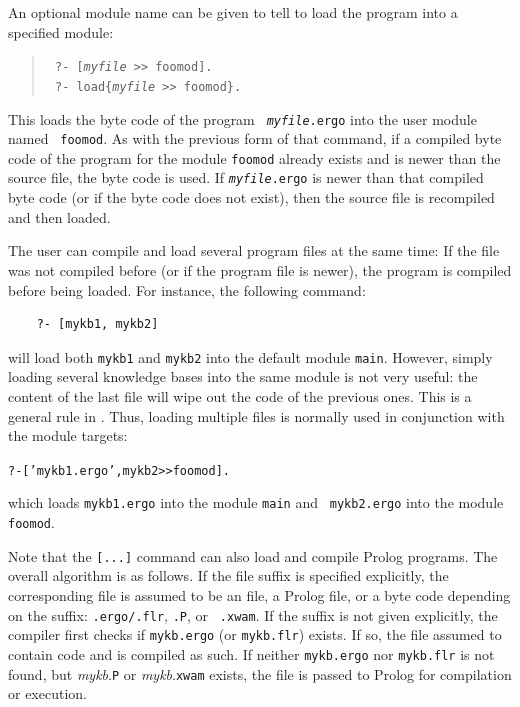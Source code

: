 \documentclass[11pt]{article}
\newcommand{\ERGO}{\mbox{\smaller{\ensuremath{\cal{E}}\smaller{{\sc{RGO}}}}}\xspace}
\newcommand{\FLSYSTEM}{\ERGO}
\newcommand{\flrext}{flr\xspace}
\newcommand{\ergoext}{ergo\xspace}
\newcommand{\ofile}{xwam}
\begin{document}
An optional module name can be given to tell \FLSYSTEM to
load the program into a specified module:
\begin{quote}
  \tt
    ?- [\textit{myfile} >{}> foomod].\\
    \tt
    ?- load\{\textit{myfile} >{}> foomod\}.
\end{quote}
This loads the byte code of the \FLSYSTEM program {\tt
  \textit{myfile}.\ergoext} into the user module named {\tt
  foomod}. As with the previous form of that command, if a compiled byte code of the program for the module
{\tt foomod} already exists and is newer than the source file, the byte code
is used.  If {\tt \textit{myfile}.\ergoext} is newer than that compiled byte code (or if
the byte code does not exist), then
the source file is recompiled and then loaded.

The user can compile and load several program
files at the same time: If the file was not compiled before (or if the
program file is newer), the program is compiled before being loaded.
For instance, the following command:
\begin{verbatim}
    ?- [mykb1, mykb2]
\end{verbatim}
will load both {\tt mykb1} and {\tt mykb2} into the default module
{\tt main}. However, simply loading several knowledge bases into the same module is not
very useful: the content of the last file will wipe out the code of the
previous ones. This is a general rule in \FLSYSTEM. Thus, loading
multiple files is normally used in conjunction with the module targets:
\begin{alltt}
    ?- ['mykb1.\ergoext', mykb2 >{}> foomod].
\end{alltt}
which loads {\tt mykb1.\ergoext} into the module {\tt main} and {\tt
  mykb2.\ergoext} into the module {\tt foomod}.


Note that the {\tt [...]} command can also load and compile Prolog programs.
The overall algorithm is as follows. If the file suffix is specified
explicitly, the corresponding file is assumed to be an \FLSYSTEM file, a Prolog
file, or a byte code depending on the suffix: {\tt .\ergoext/.\flrext}, {\tt .P}, or {\tt
  .\ofile}. If the suffix is not given explicitly, the compiler first checks if
\texttt{mykb.\ergoext} (or \texttt{mykb.\flrext})  exists. If so, the file assumed to contain \FLSYSTEM
code and is compiled as such. If neither
\texttt{mykb.\ergoext} nor \texttt{mykb.\flrext}  is not found, but {\it
  mykb}.{\tt P} or {\it mykb}.{\tt xwam} exists, the file is passed to Prolog for
compilation or execution.
\end{document}
